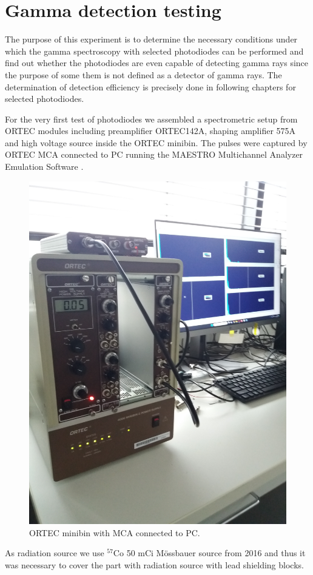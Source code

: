 \chapter{Gamma detection testing}

The purpose of this experiment is to determine the necessary conditions under which the gamma spectroscopy with selected photodiodes can be performed and find out whether the photodiodes are even capable of detecting gamma rays since the purpose of some them is not defined as a detector of gamma rays. The determination of detection efficiency is precisely done in following chapters for selected photodiodes. 
\par
For the very first test of photodiodes we assembled a spectrometric setup from ORTEC modules including preamplifier ORTEC142A, shaping amplifier 575A and high voltage source inside the ORTEC minibin. The pulses were captured by ORTEC MCA connected to PC running the MAESTRO Multichannel Analyzer Emulation Software \cite{maestro}. 


\begin{figure}[H]
 \centering
 \includegraphics[scale=0.09, angle = 270]{./pictures/ORTECbin.jpg}
 \caption{ORTEC minibin with MCA connected to PC.}
 \label{minibin}
 
\end{figure}
\par
As radiation source we use $^{57}$Co 50 mCi Mössbauer source from 2016 and thus it was necessary to cover the part with radiation source with lead shielding blocks.



